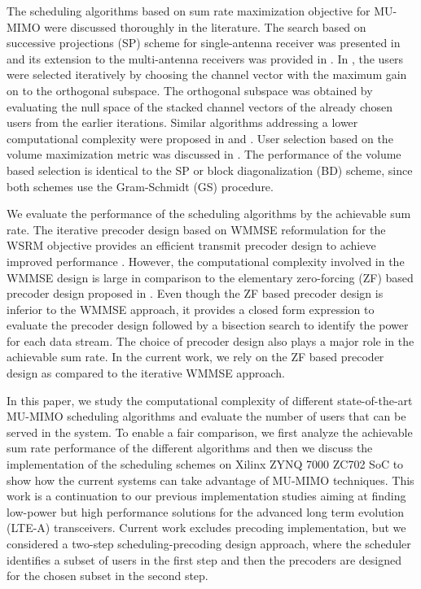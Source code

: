 \documentclass[conference,letterpaper,10pt]{./../../IEEE/IEEEtran}
\begin{document}
The scheduling algorithms based on sum rate maximization objective for MU-MIMO were discussed thoroughly in the literature. The search based on successive projections (SP) scheme for single-antenna receiver was presented in \cite{sus2006zfbf} and its extension to the multi-antenna receivers was provided in \cite{Tolli-etal-2005}. In \cite{Tolli-etal-2005}, the users were selected iteratively by choosing the channel vector with the maximum gain on to the orthogonal subspace. The orthogonal subspace was obtained by evaluating the null space of the stacked channel vectors of the already chosen users from the earlier iterations. Similar algorithms addressing a lower computational complexity were proposed in \cite{shen2006low} and \cite{youtuan2007improved}. User selection based on the volume maximization metric was discussed in \cite{jin2010novel}. The performance of the volume based selection is identical to the SP or block diagonalization (BD) scheme, since both schemes use the Gram-Schmidt (GS) procedure.

We evaluate the performance of the scheduling algorithms by the achievable sum rate. The iterative precoder design based on \ac{WMMSE} reformulation for the \ac{WSRM} objective provides an efficient transmit precoder design to achieve improved performance \cite{wmmse_shi}. However, the computational complexity involved in the \ac{WMMSE} design is large in comparison to the elementary zero-forcing (ZF) based precoder design proposed in \cite{spencer2004zero}. Even though the ZF based precoder design is inferior to the \ac{WMMSE} approach, it provides a closed form expression to evaluate the precoder design followed by a bisection search to identify the power for each data stream. The choice of precoder design also plays a major role in the achievable sum rate. In the current work, we rely on the ZF based precoder design as compared to the iterative WMMSE approach.

In this paper, we study the computational complexity of different state-of-the-art MU-MIMO scheduling algorithms and evaluate the number of users that can be served in the system. To enable a fair comparison, we first analyze the achievable sum rate performance of the different algorithms and then we discuss the implementation of the scheduling schemes on Xilinx ZYNQ 7000 ZC702 \ac{SoC} to show how the current systems can take advantage of MU-MIMO techniques. This work is a continuation to our previous implementation studies \cite{Janhunen-etal-11, Hanninen-etal-2014, Shahabuddin-etal-2014} aiming at finding low-power but high performance solutions for the advanced long term evolution (LTE-A) transceivers. Current work excludes precoding implementation, but we considered a two-step scheduling-precoding design approach, where the scheduler identifies a subset of users in the first step and then the precoders are designed for the chosen subset in the second step.
\end{document}
